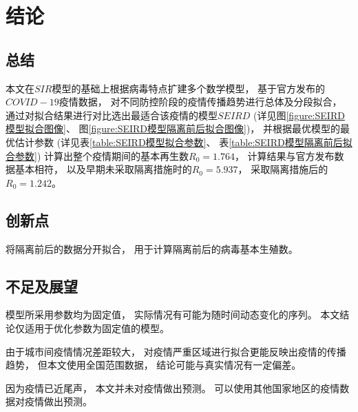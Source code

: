 \section{结论}
\subsection{总结}
\par 本文在$SIR$模型的基础上根据病毒特点扩建多个数学模型，
基于官方发布的$COVID-19$疫情数据，
对不同防控阶段的疫情传播趋势进行总体及分段拟合，
通过对拟合结果进行对比选出最适合该疫情的模型$SEIRD$
(详见图\ref{figure:SEIRD模型拟合图像}、
图\ref{figure:SEIRD模型隔离前后拟合图像})，
并根据最优模型的最优估计参数
(详见表\ref{table:SEIRD模型拟合参数}、
表\ref{table:SEIRD模型隔离前后拟合参数})
计算出整个疫情期间的基本再生数$R_0=1.764$，
计算结果与官方发布数据基本相符，
以及早期未采取隔离措施时的$R_0=5.937$，
采取隔离措施后的$R_0=1.242$。
\subsection{创新点}
\par 将隔离前后的数据分开拟合，
用于计算隔离前后的病毒基本生殖数。
\subsection{不足及展望}
\par 模型所采用参数均为固定值，
实际情况有可能为随时间动态变化的序列。
本文结论仅适用于优化参数为固定值的模型。
\par 由于城市间疫情情况差距较大，
对疫情严重区域进行拟合更能反映出疫情的传播趋势，
但本文使用全国范围数据，
结论可能与真实情况有一定偏差。
\par 因为疫情已近尾声，
本文并未对疫情做出预测。
可以使用其他国家地区的疫情数据对疫情做出预测。